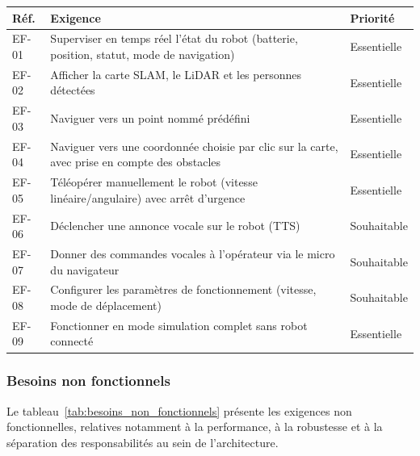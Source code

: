 \begin{center}
\begin{tabular}{|p{}|p{}|p{}|}
\hline
\textbf{Réf.} & \textbf{Exigence} & \textbf{Priorité} \\
\hline
EF-01 & Superviser en temps réel l'état du robot (batterie, position, statut,
mode de navigation) & Essentielle \\
\hline
EF-02 & Afficher la carte SLAM, le LiDAR et les personnes détectées & Essentielle \\
\hline
EF-03 & Naviguer vers un point nommé prédéfini & Essentielle \\
\hline
EF-04 & Naviguer vers une coordonnée choisie par clic sur la carte, avec prise
en compte des obstacles & Essentielle \\
\hline
EF-05 & Téléopérer manuellement le robot (vitesse linéaire/angulaire) avec arrêt
d'urgence & Essentielle \\
\hline
EF-06 & Déclencher une annonce vocale sur le robot (TTS) & Souhaitable \\
\hline
EF-07 & Donner des commandes vocales à l'opérateur via le micro du navigateur &
Souhaitable \\
\hline
EF-08 & Configurer les paramètres de fonctionnement (vitesse, mode de
déplacement) & Souhaitable \\
\hline
EF-09 & Fonctionner en mode simulation complet sans robot connecté & Essentielle \\
\hline
\end{tabular}
\label{tab:besoins_fonctionnels}
\end{center}

\subsubsection{Besoins non fonctionnels}

Le tableau~\ref{tab:besoins_non_fonctionnels} présente les exigences non
fonctionnelles, relatives notamment à la performance, à la robustesse et à
la séparation des responsabilités au sein de l'architecture.

